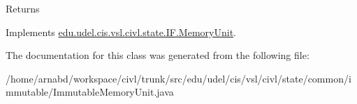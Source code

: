 \begin{DoxyReturn}{Returns}

\end{DoxyReturn}


Implements \hyperlink{interfaceedu_1_1udel_1_1cis_1_1vsl_1_1civl_1_1state_1_1IF_1_1MemoryUnit_a13a6246faf7dfcc1329992570e77bf1c}{edu.\+udel.\+cis.\+vsl.\+civl.\+state.\+I\+F.\+Memory\+Unit}.



The documentation for this class was generated from the following file\+:\begin{DoxyCompactItemize}
\item 
/home/arnabd/workspace/civl/trunk/src/edu/udel/cis/vsl/civl/state/common/immutable/Immutable\+Memory\+Unit.\+java\end{DoxyCompactItemize}
